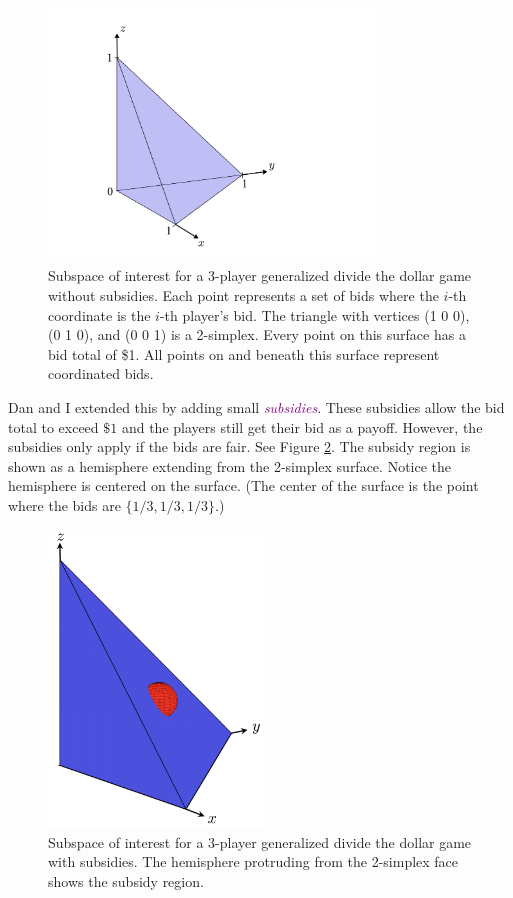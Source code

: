 \documentclass{article}   	%
\begin{document}
\begin{figure}[htb]
\centerline{\includegraphics[width=8.7cm,height=6.9cm]{simplex}}
\caption{Subspace of interest for a 3-player generalized divide the dollar game without subsidies. Each point represents a set of bids where the $i$-th coordinate is the $i$-th player's bid. The triangle with vertices (1 0 0), (0 1 0), and (0 0 1) is a 2-simplex. Every point
on this surface has a bid total of \$1. All points on and beneath this surface represent coordinated bids. }
\label{fig1}
\end{figure}

Dan and I extended this by adding small \textcolor{purple}{\textit{subsidies}}. These subsidies allow the bid total to exceed $\$1$ and the players still get their bid as a payoff. However, the subsidies only apply if the bids are fair.  See Figure \ref{fig2}. The subsidy region is shown as a hemisphere extending from the 2-simplex surface. Notice the hemisphere is centered on the surface. (The center of the surface is the point where the bids are $\{1/3, 1/3, 1/3\}$.)

\begin{figure}[htb]
\centerline{\includegraphics[width=5.7cm,height=7.9cm]{subsidize}}
\caption{Subspace of interest for a 3-player generalized divide the dollar game with subsidies. The hemisphere protruding from the 2-simplex face shows the subsidy region. }
\label{fig2}
\end{figure}
\end{document}
